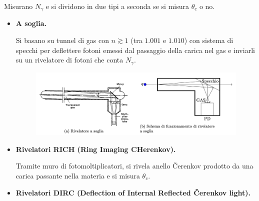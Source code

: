 \documentclass[10pt, a4paper]{scrartcl}
\numberwithin{equation}{subsection}
\theoremstyle{style1}
\begin{document}
Misurano $N_\gamma$ e si dividono in due tipi a seconda se si misura $\theta _c$ o no.
\begin{itemize}
	\item \textbf{A soglia.}

		Si basano su tunnel di gas con $n \gtrsim 1$ (tra $1.001$ e $1.010$) con sistema di specchi per deflettere fotoni emessi dal passaggio della carica nel gas e inviarli su un rivelatore di fotoni che conta $N_\gamma$.
		\begin{figure}[h!]
			\centering
			\includegraphics[width=1\columnwidth]{rc-as.png}
		\end{figure}
	\item \textbf{Rivelatori RICH (Ring Imaging CHerenkov).}

		Tramite muro di fotomoltiplicatori, si rivela anello \v Cerenkov prodotto da una carica passante nella materia e si misura $\theta _c$.

	\item \textbf{Rivelatori DIRC (Deflection of Internal Reflected \v Cerenkov light).} 


\end{itemize}
\end{document}
